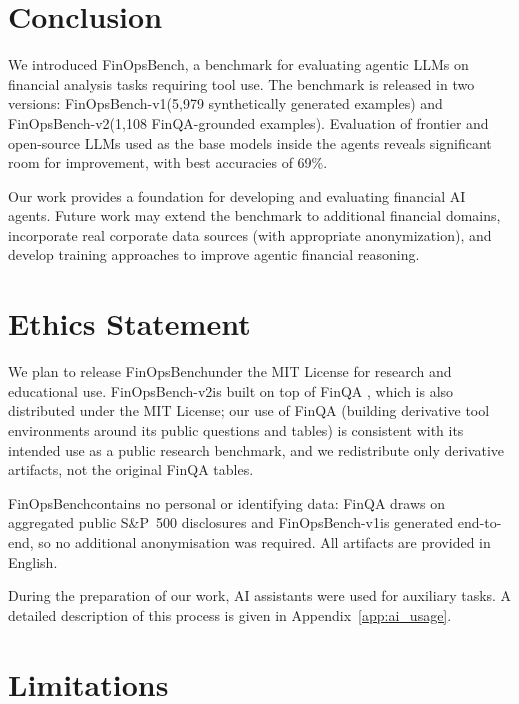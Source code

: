 \documentclass[11pt]{article}
\newcommand{\datasetname}{FinOpsBench}\xspace
\newcommand{\synthsubset}{FinOpsBench-v1}\xspace
\newcommand{\groundedfinqa}{FinOpsBench-v2}\xspace
\begin{document}
\section{Conclusion}

We introduced \datasetname, a benchmark for evaluating agentic LLMs on financial analysis tasks requiring tool use. The benchmark is released in two versions: \synthsubset (5,979 synthetically generated examples) and \groundedfinqa (1,108 FinQA-grounded examples). Evaluation of frontier and open-source LLMs used as the base models inside the agents reveals significant room for improvement, with best accuracies of 69\%.

Our work provides a foundation for developing and evaluating financial AI agents. Future work may extend the benchmark to additional financial domains, incorporate real corporate data sources (with appropriate anonymization), and develop training approaches to improve agentic financial reasoning.

\section*{Ethics Statement}

We plan to release \datasetname under the MIT License for research and educational use. \groundedfinqa is built on top of FinQA \citep{chen2021finqa}, which is also distributed under the MIT License; our use of FinQA (building derivative tool environments around its public questions and tables) is consistent with its intended use as a public research benchmark, and we redistribute only derivative artifacts, not the original FinQA tables.

\datasetname contains no personal or identifying data: FinQA draws on aggregated public S\&P~500 disclosures and \synthsubset is generated end-to-end, so no additional anonymisation was required. All artifacts are provided in English.

During the preparation of our work, AI assistants were used for auxiliary tasks. A detailed description of this process is given in Appendix~\ref{app:ai_usage}.

\section*{Limitations}
\end{document}
